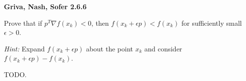\textbf{Griva, Nash, Sofer 2.6.6}

Prove that if $p^T \nabla f(x_k) < 0$, then $f(x_k + \epsilon p) < f(x_k)$ for 
sufficiently small $\epsilon > 0$.

\textit{Hint: } Expand $f(x_k + \epsilon p)$ about the point $x_k$ and consider
$f(x_k + \epsilon p) - f(x_k)$.

\begin{solution}
  TODO.
  \ \\
\end{solution}